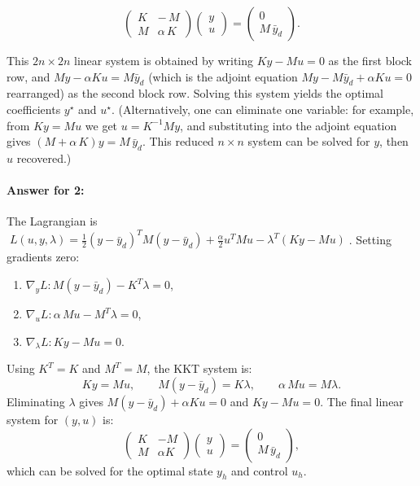 \documentclass[a4paper,10pt]{report}
\begin{document}
\[
	\begin{pmatrix} K & -\,M      \\[6pt]
                M & \alpha\,K\end{pmatrix}
	\begin{pmatrix}
		y \\[3pt] u
	\end{pmatrix} =
	\begin{pmatrix}
		0 \\[3pt]
		M\,\bar y_d
	\end{pmatrix}.
\]

This \(2n\times 2n\) linear system is obtained by writing \(K y - M u = 0\) as the first block row, and \(M y - \alpha K u = M \bar y_d\) (which is the adjoint equation \(M y - M \bar y_d + \alpha K u=0\) rearranged) as the second block row.  Solving this system yields the optimal coefficients \(y^\star\) and \(u^\star\).  (Alternatively, one can eliminate one variable: for example, from \(K y=M u\) we get \(u = K^{-1} M y\), and substituting into the adjoint equation gives \((M + \alpha\,K) y = M\,\bar y_d\). This reduced \(n\times n\) system can be solved for \(y\), then \(u\) recovered.)

\paragraph{Answer for 2:}
The Lagrangian is \(\;L(u,y,\lambda) = \frac{1}{2}(y-\bar y_d)^T M (y-\bar y_d) + \frac{\alpha}{2} u^T M u - \lambda^T(Ky - M u)\;\).
Setting gradients zero:
\begin{enumerate}
	\item \(\nabla_y L: M(y-\bar y_d) - K^T\lambda = 0\),
	\item \(\nabla_u L: \alpha\,M u - M^T\lambda = 0\),
	\item \(\nabla_\lambda L: K y - M u = 0\).
\end{enumerate}


Using \(K^T=K\) and \(M^T=M\), the KKT system is:
\[ K y = M u, \qquad M(y-\bar y_d) = K\lambda, \qquad \alpha\,M u = M\lambda. \]
Eliminating \(\lambda\) gives \(M(y-\bar y_d) + \alpha K u = 0\) and \(K y - M u = 0\). The final linear system for \((y,u)\) is:
\[ \begin{pmatrix}K & -M\\ M & \alpha K\end{pmatrix}\begin{pmatrix}y\\ u\end{pmatrix} = \begin{pmatrix}0\\ M\,\bar y_d\end{pmatrix}, \]
which can be solved for the optimal state \(y_h\) and control \(u_h\).
\end{document}
